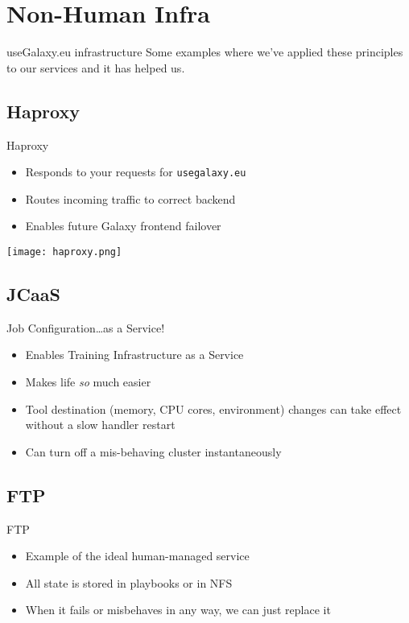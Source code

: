 \documentclass[12pt]{ufrslides}
\begin{document}
\section{Non-Human Infra}
\begin{frame}{useGalaxy.eu infrastructure}
	Some examples where we've applied these principles to our services and it has helped us.
\end{frame}


\subsection{Haproxy}
\begin{frame}{Haproxy}
	\begin{itemize}
		\item Responds to your requests for \texttt{usegalaxy.eu}
		\item Routes incoming traffic to correct backend
		\item Enables future Galaxy frontend failover
	\end{itemize}
	\vfill
	\texttt{[image: haproxy.png]}
\end{frame}

\subsection{JCaaS}
\begin{frame}{Job Configuration\ldots{}as a Service!}
	\begin{itemize}
		\item Enables Training Infrastructure as a Service
		\item Makes life \emph{so} much easier
		\item Tool destination (memory, CPU cores, environment) changes can take effect without a slow handler restart
		\item Can turn off a mis-behaving cluster instantaneously
	\end{itemize}
\end{frame}

\subsection{FTP}
\begin{frame}{FTP}
	\begin{itemize}
		\item Example of the ideal human-managed service
		\item All state is stored in playbooks or in NFS
		\item When it fails or misbehaves in any way, we can just replace it
	\end{itemize}
\end{frame}
\end{document}
